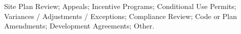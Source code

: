 Site Plan Review; Appeals; Incentive Programs; Conditional Use Permits; Variances / Adjustments / Exceptions; Compliance Review; Code or Plan Amendments; Development Agreements; Other.